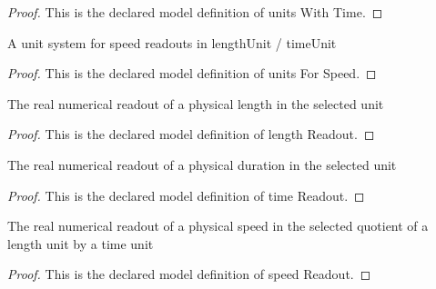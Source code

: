 \begin{proof}
  This is the declared model definition of units With Time.
\end{proof}
\begin{definition}
  \label{def:physics:phyx-mini-0727:phyxminiproblems-problemphyxmini0727-unitsforspeed}
  A unit system for speed readouts in lengthUnit / timeUnit
\end{definition}
\begin{proof}
  This is the declared model definition of units For Speed.
\end{proof}
\begin{definition}
  \label{def:physics:phyx-mini-0727:phyxminiproblems-problemphyxmini0727-lengthreadout}
  The real numerical readout of a physical length in the selected unit
\end{definition}
\begin{proof}
  This is the declared model definition of length Readout.
\end{proof}
\begin{definition}
  \label{def:physics:phyx-mini-0727:phyxminiproblems-problemphyxmini0727-timereadout}
  The real numerical readout of a physical duration in the selected unit
\end{definition}
\begin{proof}
  This is the declared model definition of time Readout.
\end{proof}
\begin{definition}
  \label{def:physics:phyx-mini-0727:phyxminiproblems-problemphyxmini0727-speedreadout}
  The real numerical readout of a physical speed in the selected quotient of a length unit by a time unit
\end{definition}
\begin{proof}
  This is the declared model definition of speed Readout.
\end{proof}
